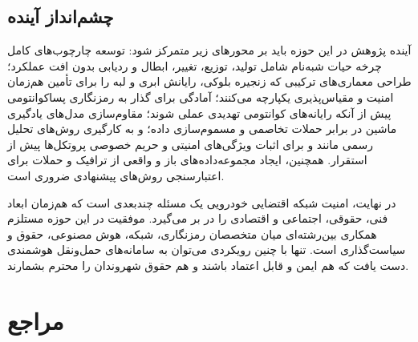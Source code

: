 \documentclass[12pt,a4paper]{article}
\begin{document}
\subsection{چشم‌انداز آینده}
آینده پژوهش در این حوزه باید بر محورهای زیر متمرکز شود: توسعه چارچوب‌های کامل چرخه حیات شبه‌نام شامل تولید، توزیع، تغییر، ابطال و ردیابی بدون افت عملکرد؛ طراحی معماری‌های ترکیبی که زنجیره بلوکی، رایانش ابری و لبه را برای تأمین هم‌زمان امنیت و مقیاس‌پذیری یکپارچه می‌کنند؛ آمادگی برای گذار به رمزنگاری پساکوانتومی پیش از آنکه رایانه‌های کوانتومی تهدیدی عملی شوند؛ مقاوم‌سازی مدل‌های یادگیری ماشین در برابر حملات تخاصمی و مسموم‌سازی داده؛ و به کارگیری روش‌های تحلیل رسمی مانند  و  برای اثبات ویژگی‌های امنیتی و حریم خصوصی پروتکل‌ها پیش از استقرار. همچنین، ایجاد مجموعه‌داده‌های باز و واقعی از ترافیک و حملات  برای اعتبارسنجی روش‌های پیشنهادی ضروری است.

در نهایت، امنیت شبکه اقتضایی خودرویی یک مسئله چندبعدی است که هم‌زمان ابعاد فنی، حقوقی، اجتماعی و اقتصادی را در بر می‌گیرد. موفقیت در این حوزه مستلزم همکاری بین‌رشته‌ای میان متخصصان رمزنگاری، شبکه، هوش مصنوعی، حقوق و سیاست‌گذاری است. تنها با چنین رویکردی می‌توان به سامانه‌های حمل‌ونقل هوشمندی دست یافت که هم ایمن و قابل اعتماد باشند و هم حقوق شهروندان را محترم بشمارند.

\newpage

\section*{مراجع}

\begin{latin}
\printbibliography[heading=none]
\end{latin}
\end{document}
